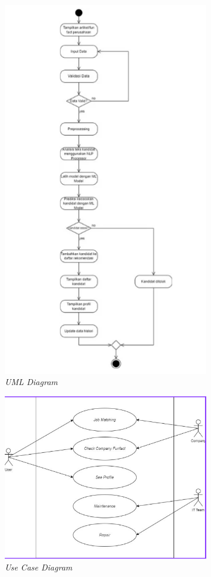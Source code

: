 \documentclass[journal,article,submit,pdftex,moreauthors]{Definitions/mdpi}
\begin{document}
\begin{figure}[H]
    \centering
    \includegraphics[width=0.8\textwidth]{image/uml.png}
    \captionsetup{justification=centering}
    \caption{\textit{UML Diagram}}
    \label{fig:enter-label}
\end{figure}

\begin{figure}[H]
    \centering
    \includegraphics[width=0.8\textwidth]{image/usecase.png}
    \captionsetup{justification=centering}
    \caption{\textit{Use Case Diagram}}
    \label{fig:enter-label}
\end{figure}
\end{document}

